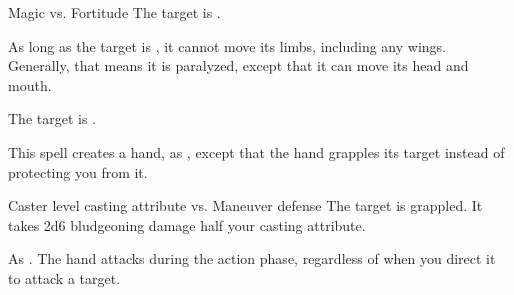 \begin{spellheader}
    \spellrng{\rngmed}
    \spelldur{\durshort}
\end{spellheader}
\begin{spelleffects}
    \begin{spellattack}{Magic vs. Fortitude}
        \spellsuccess The target is \staggered.

        As long as the target is \bloodied, it cannot move its limbs, including any wings. Generally, that means it is paralyzed, except that it can move its head and mouth.
    \end{spellattack}
\end{spelleffects}
\begin{spellfooter}

\end{spellfooter}

\begin{spellheader}
    \spelldur{\durmed}
\end{spellheader}
\begin{spelleffects}
    The target is \vulnerable.
\end{spelleffects}
\begin{spellfooter}

\end{spellfooter}

\begin{spellheader}
    \spellrng{\rngmed}
    \spelldur{\durshort \dismissable}
\end{spellheader}
\begin{spelleffects}
    \spelleffect This spell creates a hand, as , except that the hand grapples its target instead of protecting you from it.
    \begin{spellattack}{Caster level \add casting attribute vs. Maneuver defense}
        \spellsuccess The target is grappled. It takes 2d6 bludgeoning damage \add half your casting attribute.
    \end{spellattack}
\end{spelleffects}
\begin{spellfooter}
    \spellnotes As . The hand attacks during the action phase, regardless of when you direct it to attack a target.
\end{spellfooter}

